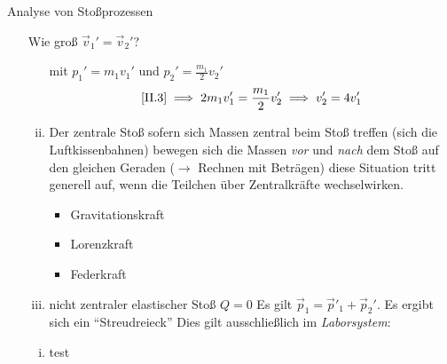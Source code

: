 \documentclass[a4paper,10pt]{scrartcl}
\begin{document}
\begin{seg}{Analyse von Stoßprozessen}
\begin{enumerate}[a]
\begin{seg}{Wie groß $\vec v_1'=\vec v_2'$?}
\begin{enumerate}[(i)]
mit $p_1'=m_1 v_1'$ und $p_2'=\frac{m_1}{2} v_2'$
\[
 \ref{II.3} \implies 2m_1 v_1'= \frac{m_1}{2} v_2' \implies v_2'=4 v_1'
\]
\item \begin{seg}{Der zentrale Stoß}
sofern sich Massen zentral beim Stoß treffen (sich die Luftkissenbahnen) bewegen sich die Massen \emph{vor} und \emph{nach} dem Stoß auf den gleichen Geraden ($\to$ Rechnen mit Beträgen) diese Situation tritt generell auf, wenn die Teilchen über Zentralkräfte wechselwirken.
\end{seg}
\begin{exs*}
 \begin{itemize}
  \item Gravitationskraft
  \item Lorenzkraft
  \item Federkraft
 \end{itemize}
\end{exs*}
\item nicht zentraler elastischer Stoß $Q=0$
Es gilt $\vec p_1=\vec p'_1+ \vec p_2'$. Es ergibt sich ein "`Streudreieck"'
Dies gilt ausschließlich im \emph{Laborsystem}:
\end{enumerate}
\begin{enumerate}[(i)]
\item test

\end{enumerate}
\end{seg}
\end{enumerate}
\end{seg}
\end{document}
